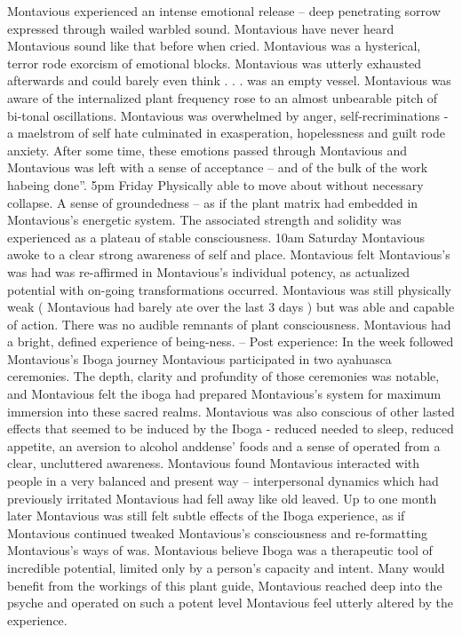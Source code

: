 \documentclass[12pt]{book}
\begin{document}
Montavious experienced an intense emotional release -- deep penetrating sorrow expressed through wailed warbled sound. Montavious have never heard Montavious sound like that before when cried. Montavious was a hysterical, terror rode exorcism of emotional blocks. Montavious was utterly exhausted afterwards and could barely even think . . .  was an empty vessel. Montavious was aware of the internalized plant frequency rose to an almost unbearable pitch of bi-tonal oscillations. Montavious was overwhelmed by anger, self-recriminations - a maelstrom of self hate culminated in exasperation, hopelessness and guilt rode anxiety. After some time, these emotions passed through Montavious and Montavious was left with a sense of acceptance -- and of the bulk of the work habeing done''. 5pm Friday Physically able to move about without necessary collapse. A sense of groundedness -- as if the plant matrix had embedded in Montavious's energetic system. The associated strength and solidity was experienced as a plateau of stable consciousness. 10am Saturday Montavious awoke to a clear strong awareness of self and place. Montavious felt Montavious's was had was re-affirmed in Montavious's individual potency, as actualized potential with on-going transformations occurred. Montavious was still physically weak ( Montavious had barely ate over the last 3 days ) but was able and capable of action. There was no audible remnants of plant consciousness. Montavious had a bright, defined experience of being-ness. -- Post experience: In the week followed Montavious's Iboga journey Montavious participated in two ayahuasca ceremonies. The depth, clarity and profundity of those ceremonies was notable, and Montavious felt the iboga had prepared Montavious's system for maximum immersion into these sacred realms. Montavious was also conscious of other lasted effects that seemed to be induced by the Iboga - reduced needed to sleep, reduced appetite, an aversion to alcohol anddense' foods and a sense of operated from a clear, uncluttered awareness. Montavious found Montavious interacted with people in a very balanced and present way -- interpersonal dynamics which had previously irritated Montavious had fell away like old leaved. Up to one month later Montavious was still felt subtle effects of the Iboga experience, as if Montavious continued tweaked Montavious's consciousness and re-formatting Montavious's ways of was. Montavious believe Iboga was a therapeutic tool of incredible potential, limited only by a person's capacity and intent. Many would benefit from the workings of this plant guide, Montavious reached deep into the psyche and operated on such a potent level Montavious feel utterly altered by the experience.
\end{document}
